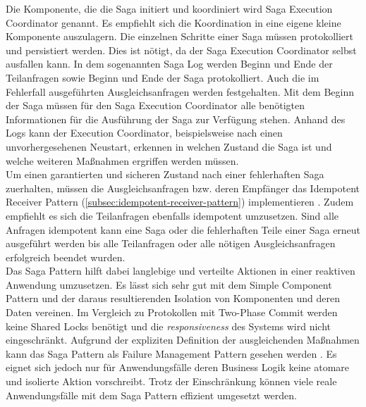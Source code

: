 Die Komponente, die die Saga initiert und koordiniert wird Saga Execution Coordinator genannt. Es empfiehlt sich die Koordination in eine eigene kleine Komponente auszulagern. Die einzelnen Schritte einer Saga müssen protokolliert und persistiert werden. Dies ist nötigt, da der Saga Execution Coordinator selbst ausfallen kann. In dem sogenannten Saga Log werden Beginn und Ende der Teilanfragen sowie Beginn und Ende der Saga protokolliert. Auch die im Fehlerfall ausgeführten Ausgleichsanfragen werden festgehalten. Mit dem Beginn der Saga müssen für den Saga Execution Coordinator alle benötigten Informationen für die Ausführung der Saga zur Verfügung stehen. Anhand des Logs kann der Execution Coordinator, beispielsweise nach einen unvorhergesehenen Neustart, erkennen in welchen Zustand die Saga ist und welche weiteren Maßnahmen ergriffen werden müssen.\\
Um einen garantierten und sicheren Zustand nach einer fehlerhaften Saga zuerhalten, müssen die Ausgleichsanfragen bzw. deren Empfänger das Idempotent Receiver Pattern (\ref{subsec:idempotent-receiver-pattern}) implementieren \cite{mccaffrey_goto_2015}. Zudem empfiehlt es sich die Teilanfragen ebenfalls idempotent umzusetzen. Sind alle Anfragen idempotent kann eine Saga oder die fehlerhaften Teile einer Saga erneut ausgeführt werden bis alle Teilanfragen oder alle nötigen Ausgleichsanfragen erfolgreich beendet wurden.\\

Das Saga Pattern hilft dabei langlebige und verteilte Aktionen in einer reaktiven Anwendung umzusetzen. Es lässt sich sehr gut mit dem Simple Component Pattern und der daraus resultierenden Isolation von Komponenten und deren Daten vereinen. Im Vergleich zu Protokollen mit Two-Phase Commit werden keine Shared Locks benötigt und die \textit{responsiveness} des Systems wird nicht eingeschränkt. Aufgrund der expliziten Definition der ausgleichenden Maßnahmen kann das Saga Pattern als Failure Management Pattern gesehen werden \cite{mccaffrey_goto_2015}. Es eignet sich jedoch nur für Anwendungsfälle deren Business Logik keine atomare und isolierte Aktion vorschreibt. Trotz der Einschränkung können viele reale Anwendungsfälle mit dem Saga Pattern effizient umgesetzt werden.
